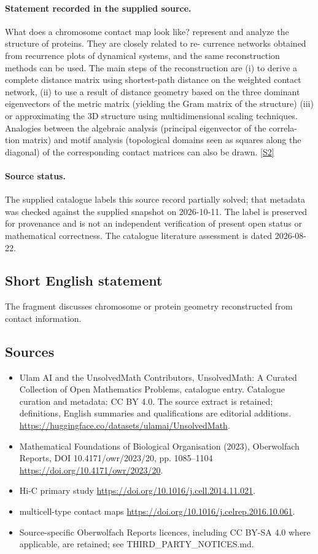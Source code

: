 \documentclass[11pt]{article}
\newcommand{\sref}[2]{\hyperlink{source:#1:#2}{[S#2]}}
\begin{document}
\paragraph{Statement recorded in the supplied source.}
What does a chromosome contact map look like? represent and analyze the structure of proteins. They are closely related to re- currence networks obtained from recurrence plots of dynamical systems, and the same reconstruction methods can be used. The main steps of the reconstruction are (i) to derive a complete distance matrix using shortest-path distance on the weighted contact network, (ii) to use a result of distance geometry based on the three dominant eigenvectors of the metric matrix (yielding the Gram matrix of the structure) (iii) or approximating the 3D structure using multidimensional scaling techniques. Analogies between the algebraic analysis (principal eigenvector of the correla- tion matrix) and motif analysis (topological domains seen as squares along the diagonal) of the corresponding contact matrices can also be drawn. \sref{statement}{2}
\paragraph{Source status.}
The supplied catalogue labels this source record partially solved; that metadata was checked against the supplied snapshot on 2026-10-11. The label is preserved for provenance and is not an independent verification of present open status or mathematical correctness. The catalogue literature assessment is dated 2026-08-22.
\subsection{Short English statement}
The fragment discusses chromosome or protein geometry reconstructed from contact information.
\subsection{Sources}
\begin{itemize}
\item[\hypertarget{source:statement:1}{S1}] Ulam AI and the UnsolvedMath Contributors, UnsolvedMath: A Curated Collection of Open Mathematics Problems, catalogue entry. Catalogue curation and metadata: CC BY 4.0. The source extract is retained; definitions, English summaries and qualifications are editorial additions.
\url{https://huggingface.co/datasets/ulamai/UnsolvedMath}.
\item[\hypertarget{source:statement:2}{S2}] Mathematical Foundations of Biological Organisation (2023), Oberwolfach Reports, DOI 10.4171/owr/2023/20, pp. 1085--1104
\url{https://doi.org/10.4171/owr/2023/20}.
\item[\hypertarget{source:statement:3}{S3}] Hi-C primary study
\url{https://doi.org/10.1016/j.cell.2014.11.021}.
\item[\hypertarget{source:statement:4}{S4}] multicell-type contact maps
\url{https://doi.org/10.1016/j.celrep.2016.10.061}.
\item Source-specific Oberwolfach Reports licences, including CC BY-SA 4.0 where applicable, are retained; see THIRD\_PARTY\_NOTICES.md.
\end{itemize}
\end{document}

